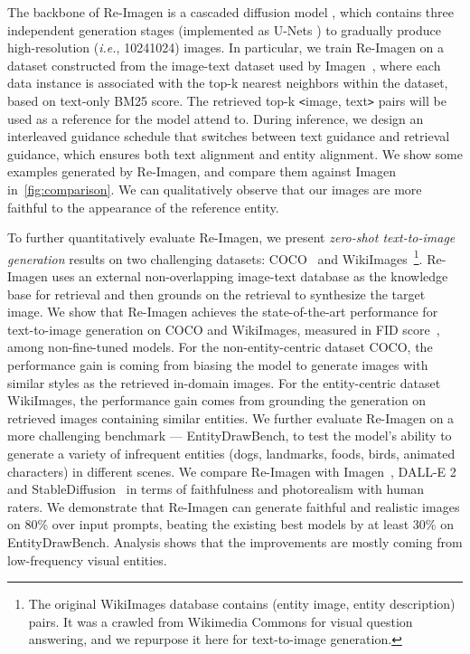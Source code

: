 \documentclass{article} \usepackage{iclr2023_conference,times}
\newcommand{\ie}{\textit{i.e.}}
\newcommand{\modelname}{{Re-Imagen}\xspace}
\begin{document}
The backbone of \modelname is a cascaded diffusion model \citep{ho2022cascaded}, which contains three independent generation stages (implemented as U-Nets \citep{ronneberger2015u}) to gradually produce high-resolution (\ie, 1024{}1024) images.
In particular, we train \modelname on a dataset constructed from the image-text dataset used by Imagen~\citep{saharia2022photorealistic}, where each data instance is associated with the top-k nearest neighbors within the dataset, based on text-only BM25 score. The retrieved top-k \texttt{<}image, text\texttt{>} pairs will be used as a reference for the model attend to. During inference, we design an interleaved guidance schedule that switches between text guidance and retrieval guidance, which ensures both text alignment and entity alignment. We show some examples generated by \modelname, and compare them against Imagen in~\autoref{fig:comparison}. We can qualitatively observe that our images are more faithful to the appearance of the reference entity.

To further quantitatively evaluate \modelname, we present \textit{zero-shot text-to-image generation} results on two challenging datasets: COCO~\citep{lin2014microsoft} and WikiImages~\citep{chang2022webqa}\footnote{The original WikiImages database contains (entity image, entity description) pairs. It was a crawled from Wikimedia Commons for visual question answering, and we repurpose it here for text-to-image generation.}. \modelname uses an external non-overlapping image-text database as the knowledge base for retrieval and then grounds on the retrieval to synthesize the target image. We show that \modelname achieves the state-of-the-art performance for text-to-image generation on COCO and WikiImages, measured in FID score~\citep{heusel2017gans}, among non-fine-tuned models. For the non-entity-centric dataset COCO, the performance gain is coming from biasing the model to generate images with similar styles as the retrieved in-domain images. For the entity-centric dataset WikiImages, the performance gain comes from grounding the generation on retrieved images containing similar entities. We further evaluate \modelname on a more challenging benchmark --- EntityDrawBench, to test the model's ability to generate a variety of infrequent entities (dogs, landmarks, foods, birds, animated characters) in different scenes. We compare \modelname with Imagen~\citep{saharia2022photorealistic}, DALL-E 2~\citep{ramesh2022hierarchical} and StableDiffusion~\citep{rombach2022high} in terms of faithfulness and photorealism with human raters. We demonstrate that \modelname can generate faithful and realistic images on 80\% over input prompts, beating the existing best models by at least 30\% on EntityDrawBench.  Analysis shows that the improvements are mostly coming from low-frequency visual entities.
\end{document}
